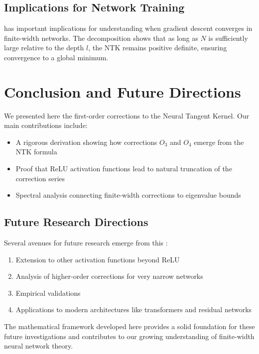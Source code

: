 \documentclass[11pt,a4paper]{article}
\theoremstyle{definition}
\begin{document}
\subsection{Implications for Network Training}

 has important implications for understanding when gradient descent converges in finite-width networks. The decomposition shows that as long as $N$ is sufficiently large relative to the depth $l$, the NTK remains positive definite, ensuring convergence to a global minimum.

\newpage

\section{Conclusion and Future Directions}

We presented here the first-order corrections to the Neural Tangent Kernel. Our main contributions include:

\begin{itemize}
\item A rigorous derivation showing how corrections $O_3$ and $O_4$ emerge from the NTK formula
\item Proof that ReLU activation functions lead to natural truncation of the correction series
\item Spectral analysis connecting finite-width corrections to eigenvalue bounds
\end{itemize}

\subsection{Future Research Directions}

Several avenues for future research emerge from this :

\begin{enumerate}
\item Extension to other activation functions beyond ReLU
\item Analysis of higher-order corrections for very narrow networks
\item Empirical validations
\item Applications to modern architectures like transformers and residual networks
\end{enumerate}

The mathematical framework developed here provides a solid foundation for these future investigations and contributes to our growing understanding of finite-width neural network theory.
\end{document}
